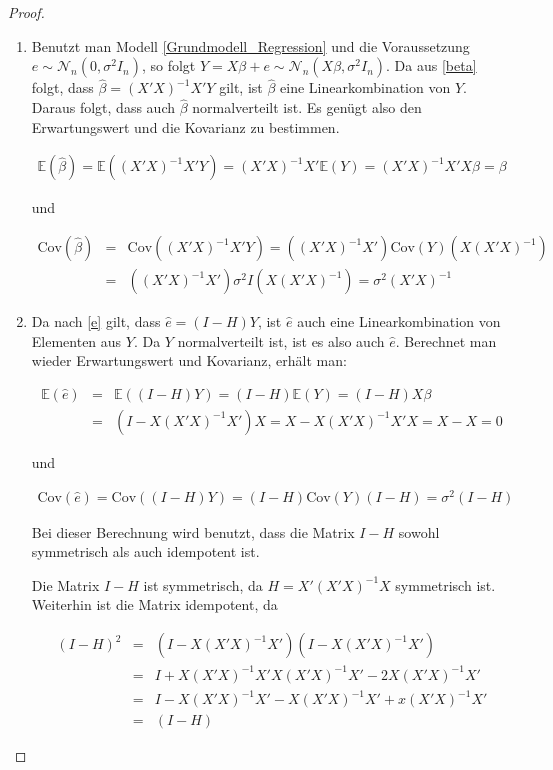 \documentclass[12pt,a4paper]{article}
\theoremstyle{definition}
\theoremstyle{definition}
\theoremstyle{definition}
\theoremstyle{definition}
\begin{document}
\begin{proof}
\begin{enumerate}
\item Benutzt man Modell \eqref{Grundmodell_Regression} und die Voraussetzung $ e \sim \mathscr{N}_{n}(0,\sigma^2 I_n)$, so folgt $Y=X \beta + e \sim \mathscr{N}_{n}(X\beta,\sigma^2 I_n)$. Da aus \eqref{beta} folgt, dass $\hat{\beta} = (X'X)^{-1} X' Y$ gilt, ist $\hat{\beta}$ eine Linearkombination von $Y$. Daraus folgt, dass auch $\hat{\beta}$ normalverteilt ist. Es genügt also den Erwartungswert und die Kovarianz zu bestimmen. 

\begin{align*}
\mathbb{E}(\hat{\beta}) = \mathbb{E}((X'X)^{-1}X'Y) = (X'X)^{-1} X' \mathbb{E}(Y) = (X'X)^{-1} X'X \beta = \beta
\end{align*}

und

\begin{eqnarray*}
\text{Cov}(\hat{\beta}) &=& \text{Cov}((X'X)^{-1} X' Y) = ((X'X)^{-1}X') \text{Cov}(Y) (X(X'X)^{-1}) \\
&=& ((X'X)^{-1}X') \sigma^2 I (X(X'X)^{-1}) = \sigma^2 (X'X)^{-1}
\end{eqnarray*}


\item Da nach \eqref{e} gilt, dass $\hat{e}=(I-H)Y$, ist $\hat{e}$ auch eine Linearkombination von Elementen aus $Y$. Da $Y$ normalverteilt ist, ist es also auch $\hat{e}$. Berechnet man wieder Erwartungswert und Kovarianz, erhält man:

\begin{eqnarray*}
\mathbb{E}(\hat{e}) &=& \mathbb{E}((I-H)Y) = (I-H)\mathbb{E}(Y) = (I-H)X\beta \\ 
&=& (I-X(X'X)^{-1}X')X = X-X(X'X)^{-1}X'X = X-X = 0
\end{eqnarray*}

und

\begin{align*}
\text{Cov}(\hat{e}) = \text{Cov}((I-H)Y) = (I-H) \text{Cov}(Y) (I-H) = \sigma^2 (I-H)
\end{align*}

Bei dieser Berechnung wird benutzt, dass die Matrix $I-H$ sowohl symmetrisch als auch idempotent ist. 

Die Matrix $I-H$ ist symmetrisch, da $H=X'(X'X)^{-1}X$ symmetrisch ist. Weiterhin ist die Matrix idempotent, da

\begin{eqnarray*}
(I-H)^2 &=& (I-X(X'X)^{-1}X')(I-X(X'X)^{-1}X') \\
&=& I + X(X'X)^{-1} X'X(X'X)^{-1}X' - 2 X(X'X)^{-1}X' \\
&=& I - X(X'X)^{-1}X' - X(X'X)^{-1}X'+ x(X'X)^{-1}X' \\
&=& (I-H)
\end{eqnarray*}



\end{enumerate}
\end{proof}
\end{document}
